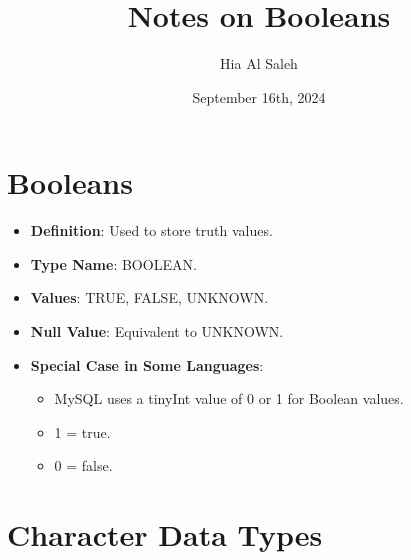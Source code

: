 \documentclass{article}
\begin{document}
\title{Notes on Booleans}
\author{Hia Al Saleh}
\date{September 16th, 2024}

\maketitle
\tableofcontents
\newpage 

\section{Booleans}

\begin{itemize}
    \item \textbf{Definition}: Used to store truth values.
    \item \textbf{Type Name}: BOOLEAN.
    \item \textbf{Values}: TRUE, FALSE, UNKNOWN.
    \item \textbf{Null Value}: Equivalent to UNKNOWN.
    \item \textbf{Special Case in Some Languages}:
    \begin{itemize}
        \item MySQL uses a tinyInt value of 0 or 1 for Boolean values.
        \item 1 = true.
        \item 0 = false.
    \end{itemize}
\end{itemize}
\section{Character Data Types}
\end{document}
